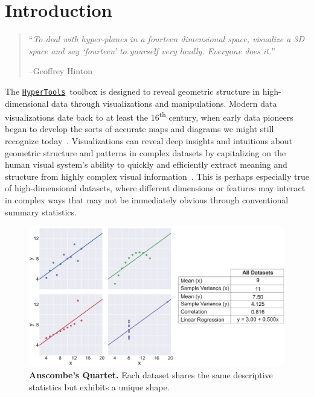 \documentclass[12pt,letterpaper]{article}
\newcommand{\hypertools}{\href{https://github.com/ContextLab/hypertools}{\texttt{HyperTools}}}
\begin{document}
\linenumbers





\section*{Introduction}

\begin{quotation}
``\textit{To deal with hyper-planes in a fourteen dimensional space, visualize a 3D space and say `fourteen' to yourself very loudly.  Everyone does it.}'' \\\begin{flushright}\vspace{-0.5cm}--Geoffrey Hinton~\cite{Hint12}\end{flushright}
\end{quotation}

The \hypertools~toolbox is designed to reveal geometric structure in high-dimensional data through visualizations and manipulations.  Modern data visualizations date back to at least the 16\textsuperscript{th} century, when early data pioneers began to develop the sorts of accurate maps and diagrams we might still recognize today~\cite{Frie06, TuftGrav83}.  Visualizations can reveal deep insights and intuitions about geometric structure and patterns in complex datasets by capitalizing on the human visual system's ability to quickly and efficiently extract meaning and structure from highly complex visual information~\cite{UddeEtal16}.  This is perhaps especially true of high-dimensional datasets, where different dimensions or features may interact in complex ways that may not be immediately obvious through conventional summary statistics.

\begin{figure}[tbp]
\centering
\includegraphics[width=1\textwidth]{anscombe}
\caption{\textbf{Anscombe's Quartet.} Each dataset shares the same descriptive statistics but exhibits a unique shape.}
\label{fig:anscomb}
\end{figure}
\end{document}
